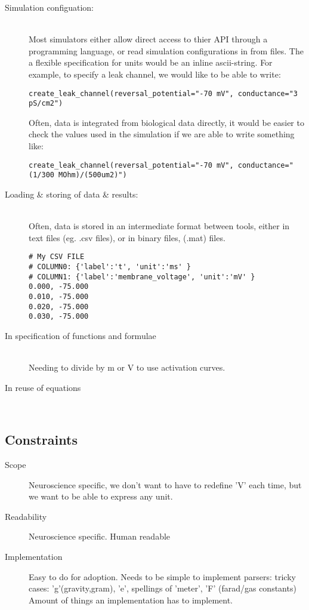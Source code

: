 \documentclass{article}
\begin{document}
\begin{description}
\item[Simulation configuation:] \hfill \\
Most simulators either allow direct access to thier API through a programming language, or read simulation configurations in from files. The a flexible specification for units would be an inline ascii-string.  For example, to specify a leak channel, we would like to be able to write:
\begin{lstlisting}
create_leak_channel(reversal_potential="-70 mV", conductance="3 pS/cm2")
\end{lstlisting}
Often, data is integrated from biological data directly, it would be easier to
check the values used in the simulation if we are able to write something like:
\begin{lstlisting}
create_leak_channel(reversal_potential="-70 mV", conductance="(1/300 MOhm)/(500um2)")
\end{lstlisting}


\item[Loading \& storing of data \& results:]  \hfill \\


Often, data is stored in an intermediate format between tools, either in text files (eg. .csv files), or in binary files, (.mat) files. 

\begin{verbatim}
# My CSV FILE
# COLUMN0: {'label':'t', 'unit':'ms' }
# COLUMN1: {'label':'membrane_voltage', 'unit':'mV' }
0.000, -75.000
0.010, -75.000
0.020, -75.000
0.030, -75.000
\end{verbatim}


\item[In specification of functions and formulae] \hfill \\
Needing to divide by m or V to use activation curves.

\item[In reuse of equations] \hfill \\


\end{description}



\subsection{Constraints}
\begin{description}
\item[Scope] Neuroscience specific, we don't want to have to redefine 'V' each time, but we want to be able to express any unit.
\item[Readability] Neuroscience specific. Human readable 
\item[Implementation] Easy to do for adoption. Needs to be simple to implement parsers: tricky cases: 'g'(gravity,gram), 'e', spellings of 'meter', 'F' (farad/gas constants)
Amount of things an implementation has to implement.
\end{description}
\end{document}
